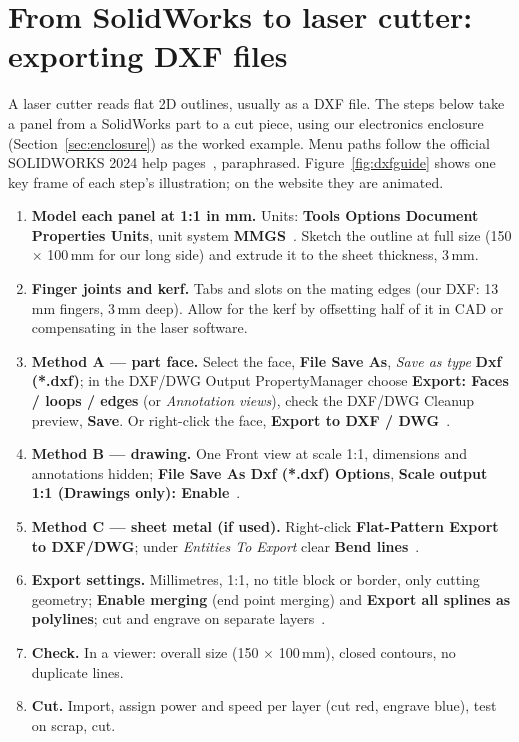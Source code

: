 \documentclass[11pt,a4paper]{report}
\begin{document}
\section{From SolidWorks to laser cutter: exporting DXF files}
\label{sec:dxfguide}
A laser cutter reads flat 2D outlines, usually as a DXF file. The steps below take a panel from a SolidWorks part to a cut piece, using our electronics enclosure (Section~\ref{sec:enclosure}) as the worked example. Menu paths follow the official SOLIDWORKS 2024 help pages~\cite{swoutput,swoptions,swsheet,swunits}, paraphrased. Figure~\ref{fig:dxfguide} shows one key frame of each step's illustration; on the website they are animated.

{\sloppy
\begin{enumerate}[itemsep=2pt]
\item \textbf{Model each panel at 1:1 in mm.} Units: \textbf{Tools \guilsinglright{} Options \guilsinglright{} Document Properties \guilsinglright{} Units}, unit system \textbf{MMGS}~\cite{swunits}. Sketch the outline at full size (150 $\times$ 100\,mm for our long side) and extrude it to the sheet thickness, 3\,mm.
\item \textbf{Finger joints and kerf.} Tabs and slots on the mating edges (our DXF: 13\,mm fingers, 3\,mm deep). Allow for the kerf by offsetting half of it in CAD or compensating in the laser software.
\item \textbf{Method A --- part face.} Select the face, \textbf{File \guilsinglright{} Save As}, \emph{Save as type} \textbf{Dxf (*.dxf)}; in the DXF/DWG Output PropertyManager choose \textbf{Export: Faces / loops / edges} (or \emph{Annotation views}), check the DXF/DWG Cleanup preview, \textbf{Save}. Or right-click the face, \textbf{Export to DXF / DWG}~\cite{swoutput}.
\item \textbf{Method B --- drawing.} One Front view at scale 1:1, dimensions and annotations hidden; \textbf{File \guilsinglright{} Save As \guilsinglright{} Dxf (*.dxf) \guilsinglright{} Options}, \textbf{Scale output 1:1 (Drawings only): Enable}~\cite{swoptions}.
\item \textbf{Method C --- sheet metal (if used).} Right-click \textbf{Flat-Pattern \guilsinglright{} Export to DXF/DWG}; under \emph{Entities To Export} clear \textbf{Bend lines}~\cite{swsheet}.
\item \textbf{Export settings.} Millimetres, 1:1, no title block or border, only cutting geometry; \textbf{Enable merging} (end point merging) and \textbf{Export all splines as polylines}; cut and engrave on separate layers~\cite{swoptions}.
\item \textbf{Check.} In a viewer: overall size (150 $\times$ 100\,mm), closed contours, no duplicate lines.
\item \textbf{Cut.} Import, assign power and speed per layer (cut red, engrave blue), test on scrap, cut.
\end{enumerate}
\par}
\end{document}
